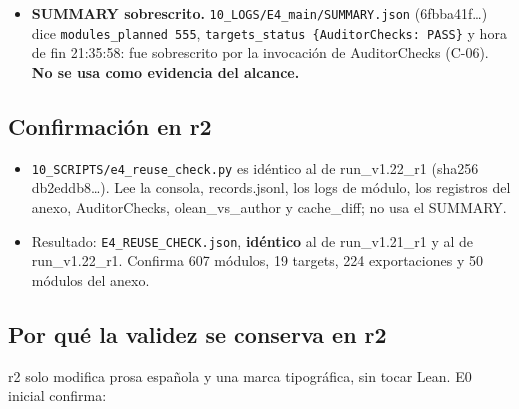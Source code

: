 \documentclass[
]{article}
\providecommand{\tightlist}{%
  \setlength{\itemsep}{0pt}\setlength{\parskip}{0pt}}
\begin{document}
\begin{itemize}
  \begin{itemize}
  \tightlist
  \item
    461 \emph{registros} de axiomas según la regla del autor, de los
    cuales 314 son salidas reales de \texttt{\#print\ axioms}; los demás
    son líneas de auditoría que se repiten.
  \item
    En AuditorChecks: \texttt{\#print\ axioms} sobre 18 declaraciones
    principales, todas exactamente con {[}propext, Classical.choice,
    Quot.sound{]}.
  \item
    Recorrido propio de conos (tipo + valor) de 50 declaraciones
    públicas: 0 axiomas no estándar, 0 \texttt{sorryAx}, 0 constantes
    bajo \texttt{Erdos81}.
  \end{itemize}
\item
  \textbf{SUMMARY sobrescrito.} \texttt{10\_LOGS/E4\_main/SUMMARY.json}
  (6fbba41f\ldots) dice \texttt{modules\_planned\ 555},
  \texttt{targets\_status\ \{AuditorChecks:\ PASS\}} y hora de fin
  21:35:58: fue sobrescrito por la invocación de AuditorChecks (C-06).
  \textbf{No se usa como evidencia del alcance.}
\end{itemize}

\subsection{Confirmación en r2}\label{confirmaciuxf3n-en-r2}

\begin{itemize}
\tightlist
\item
  \texttt{10\_SCRIPTS/e4\_reuse\_check.py} es idéntico al de
  run\_v1.22\_r1 (sha256 db2eddb8\ldots). Lee la consola, records.jsonl,
  los logs de módulo, los registros del anexo, AuditorChecks,
  olean\_vs\_author y cache\_diff; no usa el SUMMARY.
\item
  Resultado: \texttt{E4\_REUSE\_CHECK.json}, \textbf{idéntico} al de
  run\_v1.21\_r1 y al de run\_v1.22\_r1. Confirma 607 módulos, 19
  targets, 224 exportaciones y 50 módulos del anexo.
\end{itemize}

\subsection{Por qué la validez se conserva en
r2}\label{por-quuxe9-la-validez-se-conserva-en-r2}

r2 solo modifica prosa española y una marca tipográfica, sin tocar Lean.
E0 inicial confirma:
\end{document}
